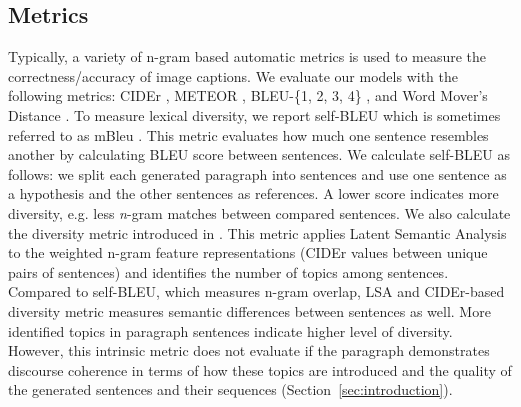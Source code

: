 \documentclass[11pt,a4paper]{article}
\begin{document}

\subsection{Metrics}

Typically, a variety of n-gram based automatic metrics is used to measure the correctness/accuracy of image captions.
We evaluate our models %
with the following metrics: CIDEr \cite{vedantam2014cider}, METEOR \cite{meteor14}, BLEU-\{1, 2, 3, 4\} \cite{bleu}, and Word Mover's Distance \cite{Kusner2015FromWE,kilickaya2017}.
To measure lexical diversity, we report self-BLEU \cite{Zhu2018selfbleu} which is sometimes referred to as mBleu \cite{Shetty2017}. %
This metric evaluates how much one sentence resembles another by calculating BLEU score between sentences.
We calculate self-BLEU as follows: we split each generated paragraph into sentences and use one sentence as a hypothesis and the other sentences as references.
A lower score indicates more diversity, e.g. less \textit{n}-gram matches between compared sentences.
We also calculate the diversity metric introduced in \cite{wang2019describing}.
This metric applies Latent Semantic Analysis \cite{deerwester90indexing} to the weighted n-gram feature representations (CIDEr values between unique pairs of sentences) and identifies the number of topics among sentences.
Compared to self-BLEU, which measures n-gram overlap, LSA and CIDEr-based diversity metric measures semantic differences between sentences as well.
More identified topics in paragraph sentences indicate higher level of diversity.
However, this intrinsic metric does not evaluate if the paragraph demonstrates discourse coherence in terms of how these topics are introduced and the quality of the generated sentences and their sequences (Section~\ref{sec:introduction}). %
\end{document}
